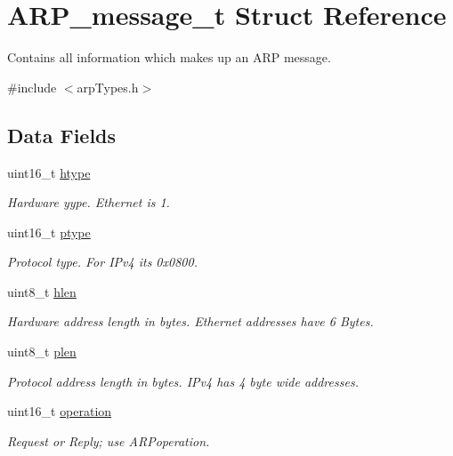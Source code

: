 \hypertarget{struct_a_r_p__message__t}{}\section{A\+R\+P\+\_\+message\+\_\+t Struct Reference}
\label{struct_a_r_p__message__t}


Contains all information which makes up an A\+RP message.  




{\ttfamily \#include $<$arp\+Types.\+h$>$}

\subsection*{Data Fields}
\begin{DoxyCompactItemize}
\item 
uint16\+\_\+t \mbox{\hyperlink{struct_a_r_p__message__t_aaf87c38602b614bc7896cf7a5a90d372}{htype}}
\begin{DoxyCompactList}\small\item\em Hardware yype. Ethernet is 1. \end{DoxyCompactList}\item 
uint16\+\_\+t \mbox{\hyperlink{struct_a_r_p__message__t_ab4891e9b77eb26f33d21cfde982564cb}{ptype}}
\begin{DoxyCompactList}\small\item\em Protocol type. For I\+Pv4 it\textquotesingle{}s 0x0800. \end{DoxyCompactList}\item 
uint8\+\_\+t \mbox{\hyperlink{struct_a_r_p__message__t_aff25a69752648654e56c4ff3e0b1b226}{hlen}}
\begin{DoxyCompactList}\small\item\em Hardware address length in bytes. Ethernet addresses have 6 Bytes. \end{DoxyCompactList}\item 
uint8\+\_\+t \mbox{\hyperlink{struct_a_r_p__message__t_ae414f6c2299d9cf0eff8aa8e81f538d8}{plen}}
\begin{DoxyCompactList}\small\item\em Protocol address length in bytes. I\+Pv4 has 4 byte wide addresses. \end{DoxyCompactList}\item 
uint16\+\_\+t \mbox{\hyperlink{struct_a_r_p__message__t_ad21c763fa2f80cb8649108b759113b54}{operation}}
\begin{DoxyCompactList}\small\item\em Request or Reply; use A\+R\+Poperation. \end{DoxyCompactList}\item 

\end{DoxyCompactItemize}

